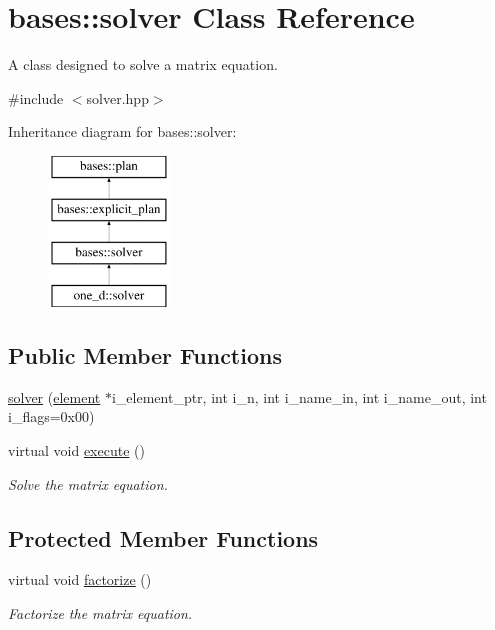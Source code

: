\hypertarget{classbases_1_1solver}{\section{bases\-:\-:solver Class Reference}
\label{classbases_1_1solver}
}


A class designed to solve a matrix equation.  




{\ttfamily \#include $<$solver.\-hpp$>$}

Inheritance diagram for bases\-:\-:solver\-:\begin{figure}[H]
\begin{center}
\leavevmode
\includegraphics[height=4.000000cm]{classbases_1_1solver}
\end{center}
\end{figure}
\subsection*{Public Member Functions}
\begin{DoxyCompactItemize}
\item 
\hyperlink{classbases_1_1solver_a7b849e5ddfd8ae55b4bbf59010d2b4bd}{solver} (\hyperlink{classbases_1_1element}{element} $\ast$i\-\_\-element\-\_\-ptr, int i\-\_\-n, int i\-\_\-name\-\_\-in, int i\-\_\-name\-\_\-out, int i\-\_\-flags=0x00)
\begin{DoxyCompactList}\small\item\em \end{DoxyCompactList}\item 
virtual void \hyperlink{classbases_1_1solver_a8adf4c428bf4322a664c811073b491e1}{execute} ()
\begin{DoxyCompactList}\small\item\em Solve the matrix equation. \end{DoxyCompactList}\end{DoxyCompactItemize}
\subsection*{Protected Member Functions}
\begin{DoxyCompactItemize}
\item 
virtual void \hyperlink{classbases_1_1solver_adfc4b2709650924535e117405e7e3a21}{factorize} ()
\begin{DoxyCompactList}\small\item\em Factorize the matrix equation. \end{DoxyCompactList}\end{DoxyCompactItemize}
